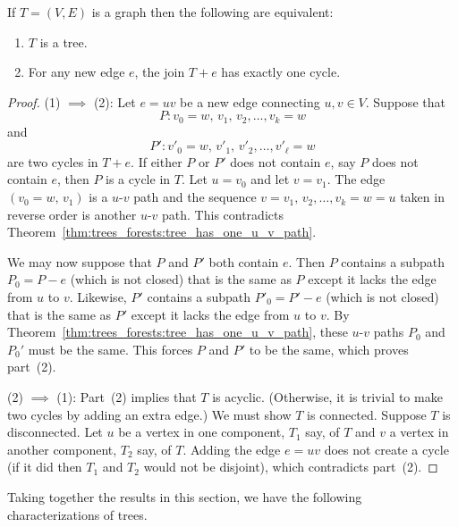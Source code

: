 \begin{theorem}
If $T = (V,E)$ is a graph then the following are equivalent:
\begin{enumerate}
\item $T$ is a tree.

\item For any new edge $e$, the join $T + e$ has exactly one cycle.
\end{enumerate}
\end{theorem}

\begin{proof}
(1) $\implies$ (2):
Let $e = uv$ be a new edge connecting $u,v \in V$. Suppose that
\[
P : v_0 = w,\, v_1,\, v_2, \dots, v_k = w
\]
and
\[
P' : v'_0 = w,\, v'_1,\, v'_2, \dots, v'_\ell = w
\]
are two cycles in $T + e$. If either $P$ or $P'$ does not contain $e$,
say $P$ does not contain $e$, then $P$ is a cycle in $T$. Let
$u = v_0$ and let $v = v_1$. The edge $(v_0 = w,\, v_1)$ is a $u$-$v$
path and the sequence $v = v_1,\, v_2, \dots, v_k = w = u$ taken in
reverse order is another $u$-$v$ path. This contradicts
Theorem~\ref{thm:trees_forests:tree_has_one_u_v_path}.

We may now suppose that $P$ and $P'$ both contain $e$. Then $P$
contains a subpath $P_0 = P - e$ (which is not closed) that is the
same as $P$ except it lacks the edge from $u$ to $v$. Likewise, $P'$
contains a subpath $P'_0=P'-e$ (which is not closed) that is the same
as $P'$ except it lacks the edge from $u$ to $v$. By
Theorem~\ref{thm:trees_forests:tree_has_one_u_v_path}, these $u$-$v$
paths $P_0$ and $P_0'$ must be the same. This forces $P$ and $P'$ to
be the same, which proves part~(2).

(2) $\implies$ (1):
Part~(2) implies that $T$ is acyclic. (Otherwise, it is trivial
to make two cycles by adding an extra edge.) We must show $T$ is
connected. Suppose $T$ is disconnected. Let $u$ be a vertex in one
component, $T_1$ say, of $T$ and $v$ a vertex in another component,
$T_2$ say, of $T$. Adding the edge $e = uv$ does not create a cycle
(if it did then $T_1$ and $T_2$ would not be disjoint), which
contradicts part~(2).
\end{proof}

Taking together the results in this section, we have the following
characterizations of trees.

